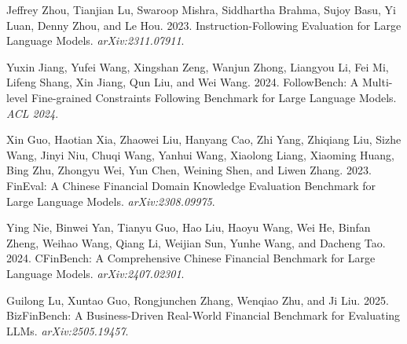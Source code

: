 \documentclass[11pt]{article}
\begin{document}
\begin{thebibliography}{}

Jeffrey Zhou, Tianjian Lu, Swaroop Mishra, Siddhartha Brahma, Sujoy Basu, Yi Luan, Denny Zhou, and Le Hou. 2023.
\newblock Instruction-Following Evaluation for Large Language Models.
\newblock \emph{arXiv:2311.07911}.

Yuxin Jiang, Yufei Wang, Xingshan Zeng, Wanjun Zhong, Liangyou Li, Fei Mi, Lifeng Shang, Xin Jiang, Qun Liu, and Wei Wang. 2024.
\newblock FollowBench: A Multi-level Fine-grained Constraints Following Benchmark for Large Language Models.
\newblock \emph{ACL 2024}.

Xin Guo, Haotian Xia, Zhaowei Liu, Hanyang Cao, Zhi Yang, Zhiqiang Liu, Sizhe Wang, Jinyi Niu, Chuqi Wang, Yanhui Wang, Xiaolong Liang, Xiaoming Huang, Bing Zhu, Zhongyu Wei, Yun Chen, Weining Shen, and Liwen Zhang. 2023.
\newblock FinEval: A Chinese Financial Domain Knowledge Evaluation Benchmark for Large Language Models.
\newblock \emph{arXiv:2308.09975}.

Ying Nie, Binwei Yan, Tianyu Guo, Hao Liu, Haoyu Wang, Wei He, Binfan Zheng, Weihao Wang, Qiang Li, Weijian Sun, Yunhe Wang, and Dacheng Tao. 2024.
\newblock CFinBench: A Comprehensive Chinese Financial Benchmark for Large Language Models.
\newblock \emph{arXiv:2407.02301}.

Guilong Lu, Xuntao Guo, Rongjunchen Zhang, Wenqiao Zhu, and Ji Liu. 2025.
\newblock BizFinBench: A Business-Driven Real-World Financial Benchmark for Evaluating LLMs.
\newblock \emph{arXiv:2505.19457}.

\end{thebibliography}
\end{document}
